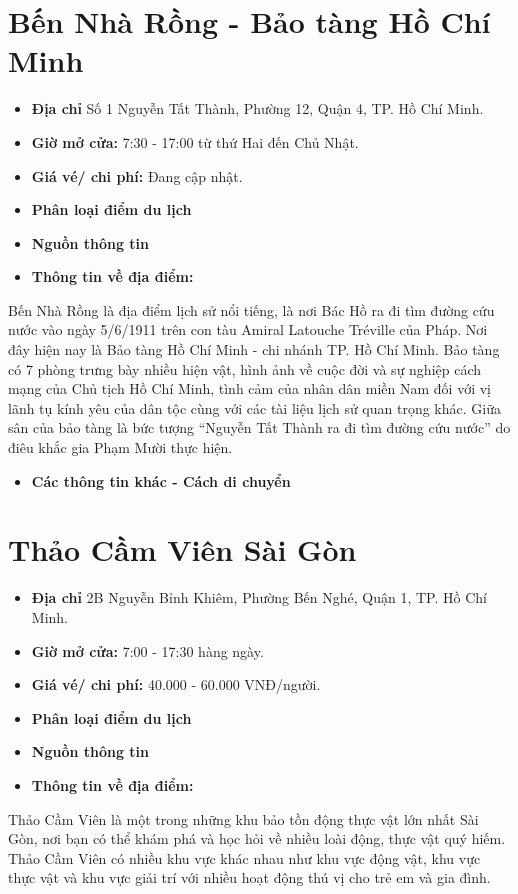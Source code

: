 \documentclass{article}
\begin{document}
\section{Bến Nhà Rồng - Bảo tàng Hồ Chí Minh}
\begin{itemize}
    \item{\textbf{Địa chỉ}} Số 1 Nguyễn Tất Thành, Phường 12, Quận 4, TP. Hồ Chí Minh.
    \item{\textbf{Giờ mở cửa:}} 7:30 - 17:00 từ thứ Hai đến Chủ Nhật.
    \item{\textbf{Giá vé/ chi phí:}} Đang cập nhật.
    \item{\textbf{Phân loại điểm du lịch} }
    \item{\textbf{Nguồn thông tin}}
    \item{\textbf{Thông tin về địa điểm:}}
\end{itemize}
Bến Nhà Rồng là địa điểm lịch sử nổi tiếng, là nơi Bác Hồ ra đi tìm đường cứu nước vào ngày 5/6/1911 trên con tàu Amiral Latouche Tréville của Pháp. Nơi đây hiện nay là Bảo tàng Hồ Chí Minh - chi nhánh TP. Hồ Chí Minh. Bảo tàng có 7 phòng trưng bày nhiều hiện vật, hình ảnh về cuộc đời và sự nghiệp cách mạng của Chủ tịch Hồ Chí Minh, tình cảm của nhân dân miền Nam đối với vị lãnh tụ kính yêu của dân tộc cùng với các tài liệu lịch sử quan trọng khác. Giữa sân của bảo tàng là bức tượng “Nguyễn Tất Thành ra đi tìm đường cứu nước” do điêu khắc gia Phạm Mười thực hiện.

\begin{itemize}
    \item{\textbf{Các thông tin khác - Cách di chuyển}}
\end{itemize}

\section{Thảo Cầm Viên Sài Gòn}
\begin{itemize}
    \item{\textbf{Địa chỉ}} 2B Nguyễn Bỉnh Khiêm, Phường Bến Nghé, Quận 1, TP. Hồ Chí Minh.
    \item{\textbf{Giờ mở cửa:}} 7:00 - 17:30 hàng ngày.
    \item{\textbf{Giá vé/ chi phí:}} 40.000 - 60.000 VNĐ/người.
    \item{\textbf{Phân loại điểm du lịch} }
    \item{\textbf{Nguồn thông tin}}
    \item{\textbf{Thông tin về địa điểm:}}
\end{itemize}
Thảo Cầm Viên là một trong những khu bảo tồn động thực vật lớn nhất Sài Gòn, nơi bạn có thể khám phá và học hỏi về nhiều loài động, thực vật quý hiếm. Thảo Cầm Viên có nhiều khu vực khác nhau như khu vực động vật, khu vực thực vật và khu vực giải trí với nhiều hoạt động thú vị cho trẻ em và gia đình.
\end{document}
